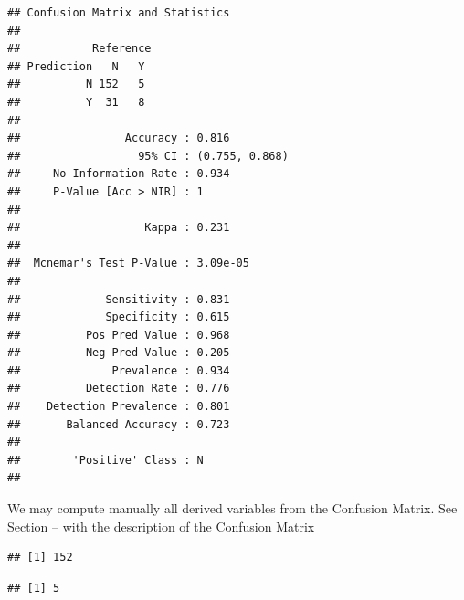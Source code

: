 \documentclass[
]{book}
\newenvironment{Shaded}{\begin{snugshade}}{\end{snugshade}}
\newcommand{\CommentTok}[1]{\textcolor[rgb]{0.56,0.35,0.01}{\textit{#1}}}
\newcommand{\DecValTok}[1]{\textcolor[rgb]{0.00,0.00,0.81}{#1}}
\newcommand{\NormalTok}[1]{#1}
\newcommand{\OtherTok}[1]{\textcolor[rgb]{0.56,0.35,0.01}{#1}}
\newcommand{\SpecialCharTok}[1]{\textcolor[rgb]{0.00,0.00,0.00}{#1}}
\begin{document}
\begin{verbatim}
## Confusion Matrix and Statistics
## 
##           Reference
## Prediction   N   Y
##          N 152   5
##          Y  31   8
##                                         
##                Accuracy : 0.816         
##                  95% CI : (0.755, 0.868)
##     No Information Rate : 0.934         
##     P-Value [Acc > NIR] : 1             
##                                         
##                   Kappa : 0.231         
##                                         
##  Mcnemar's Test P-Value : 3.09e-05      
##                                         
##             Sensitivity : 0.831         
##             Specificity : 0.615         
##          Pos Pred Value : 0.968         
##          Neg Pred Value : 0.205         
##              Prevalence : 0.934         
##          Detection Rate : 0.776         
##    Detection Prevalence : 0.801         
##       Balanced Accuracy : 0.723         
##                                         
##        'Positive' Class : N             
## 
\end{verbatim}

We may compute manually all derived variables from the Confusion Matrix. See Section -- with the description of the Confusion Matrix

\begin{Shaded}
\end{Shaded}

\begin{verbatim}
## [1] 152
\end{verbatim}

\begin{Shaded}
\end{Shaded}

\begin{verbatim}
## [1] 5
\end{verbatim}
\end{document}
